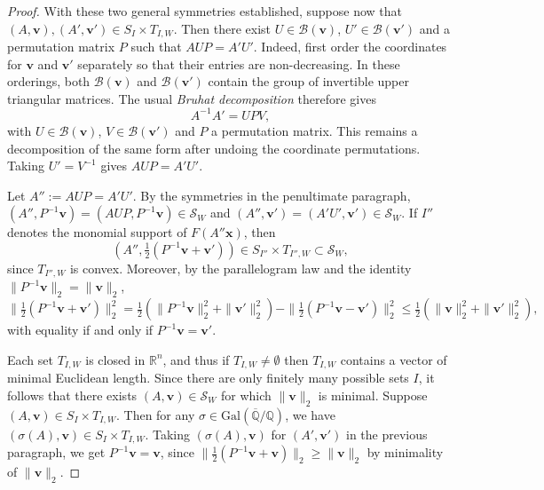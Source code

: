 \documentclass[a4paper,11pt, twoside,reqno]{amsart}
\theoremstyle{plain}
\theoremstyle{definition}
\theoremstyle{remark}
\newcommand{\Gal}{\mathrm{Gal}}
\newcommand{\bfv}{\bm{v}}
\newcommand{\bfx}{\bm{x}}
\newcommand{\RR}{\mathbb{R}}
\newcommand{\QQ}{\mathbb{Q}}
\renewcommand{\le}{\leqslant}
\renewcommand{\ge}{\geqslant}
\newcommand{\Qbar}{\overline{\mathbb{Q}}}
\numberwithin{equation}{section}
\begin{document}
\begin{proof}
With these two general symmetries established,
suppose now that $(A,\bfv),(A',\bfv')\in S_I \times T_{I,W}$.
Then there exist $U\in\mathcal{B}(\bfv)$,
$U'\in\mathcal{B}(\bfv')$
and a permutation matrix $P$ such that
$AUP = A'U'$.
Indeed, first order the coordinates for $\bfv$ and $\bfv'$
separately so that their entries are non-decreasing.
In these orderings, both $\mathcal B(\bfv)$ and
$\mathcal B(\bfv')$ contain the group of invertible upper
triangular matrices.
The usual {\em Bruhat decomposition} therefore gives
\[
A^{-1}A'=UPV,
\]
with $U\in\mathcal B(\bfv)$, $V\in\mathcal B(\bfv')$
and $P$ a permutation matrix.
This remains a decomposition of the same form after undoing
the coordinate permutations.
Taking $U'=V^{-1}$ gives $AUP=A'U'$.

Let $A'' := AUP = A'U'$.
By the symmetries in the penultimate paragraph,
$(A'',P^{-1}\bfv)=(AUP,P^{-1}\bfv)\in \mathcal{S}_W$
and $(A'',\bfv')=(A'U',\bfv')\in \mathcal{S}_W$.
If $I''$ denotes the monomial support of $F(A''\bfx)$,
then $$(A'',\tfrac12(P^{-1}\bfv+\bfv'))
\in S_{I''} \times T_{I'',W} \subset \mathcal{S}_W,$$
since $T_{I'',W}$ is convex.
Moreover, by the parallelogram law and the identity $\|P^{-1}\bfv\|_2 = \|\bfv\|_2$,
\begin{equation*}
\|\tfrac12(P^{-1}\bfv+\bfv')\|_2^2
= \tfrac12(\|P^{-1}\bfv\|_2^2 + \|\bfv'\|_2^2) - \|\tfrac12(P^{-1}\bfv-\bfv')\|_2^2
\le \tfrac12(\|\bfv\|_2^2 + \|\bfv'\|_2^2),
\end{equation*}
with equality if and only if $P^{-1}\bfv = \bfv'$.

Each set $T_{I,W}$ is closed in $\RR^n$,
and thus if $T_{I,W} \ne \emptyset$ then
$T_{I,W}$ contains a vector of minimal Euclidean length.
Since there are only finitely many possible sets $I$, it follows that
there exists $(A,\bfv)\in \mathcal{S}_W$ for which $\|\bfv\|_2$ is minimal.
Suppose $(A,\bfv)\in S_I \times T_{I,W}$.
Then for any $\sigma\in \Gal(\Qbar/\QQ)$,
we have $(\sigma(A),\bfv) \in S_I \times T_{I,W}$.
Taking $(\sigma(A),\bfv)$ for $(A',\bfv')$ in the previous paragraph,
we get $P^{-1}\bfv=\bfv$,
since $\|\tfrac12(P^{-1}\bfv+\bfv)\|_2 \ge \|\bfv\|_2$ by minimality of $\|\bfv\|_2$.


\end{proof}
\end{document}
